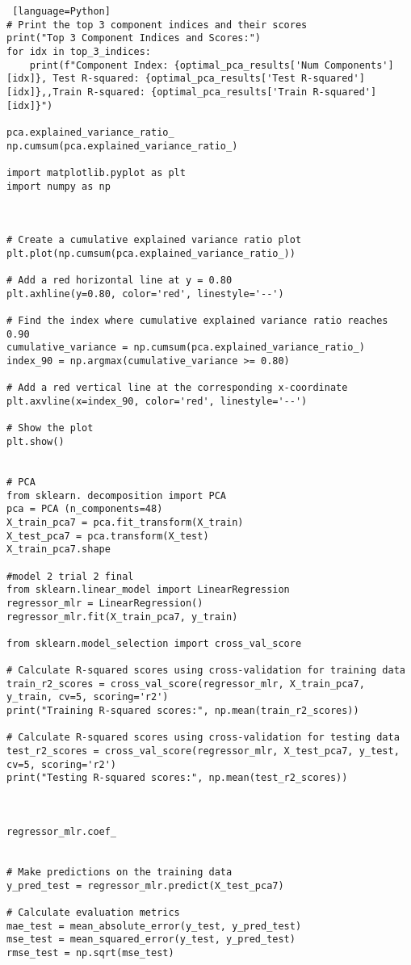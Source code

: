 \documentclass[12pt, a4paper,oneside]{book}
\numberwithin{equation}{section}
\begin{document}
\begin{lstlisting} [language=Python]
# Print the top 3 component indices and their scores
print("Top 3 Component Indices and Scores:")
for idx in top_3_indices:
    print(f"Component Index: {optimal_pca_results['Num Components'][idx]}, Test R-squared: {optimal_pca_results['Test R-squared'][idx]},,Train R-squared: {optimal_pca_results['Train R-squared'][idx]}")

pca.explained_variance_ratio_
np.cumsum(pca.explained_variance_ratio_)

import matplotlib.pyplot as plt
import numpy as np



# Create a cumulative explained variance ratio plot
plt.plot(np.cumsum(pca.explained_variance_ratio_))

# Add a red horizontal line at y = 0.80
plt.axhline(y=0.80, color='red', linestyle='--')

# Find the index where cumulative explained variance ratio reaches 0.90
cumulative_variance = np.cumsum(pca.explained_variance_ratio_)
index_90 = np.argmax(cumulative_variance >= 0.80)

# Add a red vertical line at the corresponding x-coordinate
plt.axvline(x=index_90, color='red', linestyle='--')

# Show the plot
plt.show()


# PCA
from sklearn. decomposition import PCA
pca = PCA (n_components=48)
X_train_pca7 = pca.fit_transform(X_train)
X_test_pca7 = pca.transform(X_test)
X_train_pca7.shape

#model 2 trial 2 final 
from sklearn.linear_model import LinearRegression
regressor_mlr = LinearRegression()
regressor_mlr.fit(X_train_pca7, y_train)

from sklearn.model_selection import cross_val_score

# Calculate R-squared scores using cross-validation for training data
train_r2_scores = cross_val_score(regressor_mlr, X_train_pca7, y_train, cv=5, scoring='r2')
print("Training R-squared scores:", np.mean(train_r2_scores))

# Calculate R-squared scores using cross-validation for testing data
test_r2_scores = cross_val_score(regressor_mlr, X_test_pca7, y_test, cv=5, scoring='r2')
print("Testing R-squared scores:", np.mean(test_r2_scores))



regressor_mlr.coef_


# Make predictions on the training data
y_pred_test = regressor_mlr.predict(X_test_pca7)

# Calculate evaluation metrics
mae_test = mean_absolute_error(y_test, y_pred_test)
mse_test = mean_squared_error(y_test, y_pred_test)
rmse_test = np.sqrt(mse_test)



\end{lstlisting}
\end{document}
